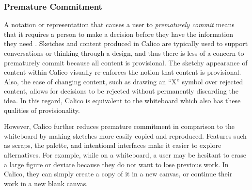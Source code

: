 \subsubsection{Premature Commitment}
A notation or representation that causes a user to \textit{prematurely commit} means that it requires a person to make a decision before they have the information they need \cite{Petre2013BookChapter}. Sketches and content produced in Calico are typically used to support conversations or thinking through a design, and thus there is less of a concern to prematurely commit because all content is provisional. The sketchy appearance of content within Calico visually re-enforces the notion that content is provisional. Also, the ease of changing content, such as drawing an ``X'' symbol over rejected content, allows for decisions to be rejected without permanently discarding the idea. In this regard, Calico is equivalent to the whiteboard which also has these qualities of provisionality. 

However, Calico further reduces premature commitment in comparison to the whiteboard by making sketches more easily copied and reproduced. Features such as scraps, the palette, and intentional interfaces make it easier to explore alternatives. For example, while on a whiteboard, a user may be hesitant to erase a large figure or deviate because they do not want to lose previous work. In Calico, they can simply create a copy of it in a new canvas, or continue their work in a new blank canvas.



